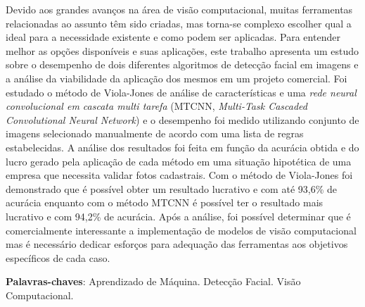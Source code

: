 
\setlength{\absparsep}{18pt} %
\begin{resumo}
  Devido aos grandes avanços na área de visão computacional, muitas ferramentas relacionadas ao assunto têm sido criadas, mas torna-se complexo escolher qual a ideal para a necessidade existente e como podem ser aplicadas. Para entender melhor as opções disponíveis e suas aplicações, este trabalho apresenta um estudo sobre o desempenho de dois diferentes algoritmos de detecção facial em imagens e a análise da viabilidade da aplicação dos mesmos em um projeto comercial. Foi estudado o método de Viola-Jones de análise de características e uma \textit{rede neural convolucional em cascata multi tarefa} (MTCNN, \textit{Multi-Task Cascaded Convolutional Neural Network}) e o desempenho foi medido utilizando conjunto de imagens selecionado manualmente de acordo com uma lista de regras estabelecidas. A análise dos resultados foi feita em função da acurácia obtida e do lucro gerado pela aplicação de cada método em uma situação hipotética de uma empresa que necessita validar fotos cadastrais. Com o método de Viola-Jones foi demonstrado que é possível obter um resultado lucrativo e com até 93,6\% de acurácia enquanto com o método MTCNN é possível ter o resultado mais lucrativo e com 94,2\% de acurácia. Após a análise, foi possível determinar que é comercialmente interessante a implementação de modelos de visão computacional mas é necessário dedicar esforços para adequação das ferramentas aos objetivos específicos de cada caso.

  \textbf{Palavras-chaves}: Aprendizado de Máquina. Detecção Facial. Visão Computacional.
\end{resumo}


